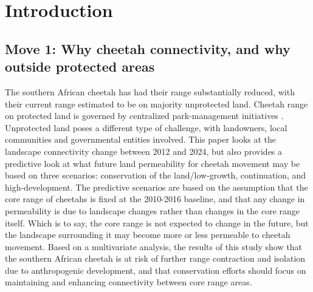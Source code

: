 \section{Introduction}
\label{sec:intro}




\subsection*{Move 1: Why cheetah connectivity, and why outside protected areas}

The southern African cheetah has had their range substantially reduced, with their current range estimated to be on majority unprotected land. Cheetah range on protected land is governed by centralized park-management initiatives . Unprotected land poses a different type of challenge, with landowners, local communities and governmental entities involved. This paper looks at the landscape connectivity change between 2012 and 2024, but also provides a predictive look at what future land permeability for cheetah movement may be based on three scenarios: conservation of the land/low-growth, continuation, and high-development. The predictive scenarios are based on the assumption that the core range of cheetahs is fixed at the 2010-2016 baseline, and that any change in permeability is due to landscape changes rather than changes in the core range itself. Which is to say, the core range is not expected to change in the future, but the landscape surrounding it may become more or less permeable to cheetah movement. Based on a multivariate analysis, the results of this study show that the southern African cheetah is at risk of further range contraction and isolation due to anthropogenic development, and that conservation efforts should focus on maintaining and enhancing connectivity between core range areas.

